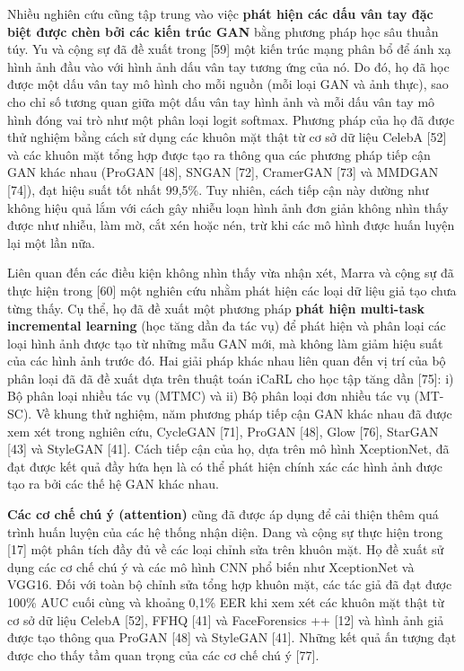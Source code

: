 \documentclass{article}
\begin{document}
Nhiều nghiên cứu cũng tập trung vào việc \textbf{phát hiện các dấu vân tay đặc biệt được chèn bởi các kiến trúc GAN} bằng phương pháp học sâu thuần túy. Yu và cộng sự đã đề xuất trong [59] một kiến trúc mạng phân bổ để ánh xạ hình ảnh đầu vào với hình ảnh dấu vân tay tương ứng của nó. Do đó, họ đã học được một dấu vân tay mô hình cho mỗi nguồn (mỗi loại GAN và ảnh thực), sao cho chỉ số tương quan giữa một dấu vân tay hình ảnh và mỗi dấu vân tay mô hình đóng vai trò như một phân loại logit softmax. Phương pháp của họ đã được thử nghiệm bằng cách sử dụng các khuôn mặt thật từ cơ sở dữ liệu CelebA [52] và các khuôn mặt tổng hợp được tạo ra thông qua các phương pháp tiếp cận GAN khác nhau (ProGAN [48], SNGAN [72], CramerGAN [73] và MMDGAN [74]), đạt hiệu suất tốt nhất 99,5\%. Tuy nhiên, cách tiếp cận này dường như không hiệu quả lắm với cách gây nhiễu loạn hình ảnh đơn giản không nhìn thấy được như nhiễu, làm mờ, cắt xén hoặc nén, trừ khi các mô hình được huấn luyện lại một lần nữa.

Liên quan đến các điều kiện không nhìn thấy vừa nhận xét, Marra và cộng sự đã thực hiện trong [60] một nghiên cứu nhằm phát hiện các loại dữ liệu giả tạo chưa từng thấy. Cụ thể, họ đã đề xuất một phương pháp \textbf{phát hiện multi-task incremental learning} (học tăng dần đa tác vụ) để phát hiện và phân loại các loại hình ảnh được tạo từ những mẫu GAN mới, mà không làm giảm hiệu suất của các hình ảnh trước đó. Hai giải pháp khác nhau liên quan đến vị trí của bộ phân loại đã đã đề xuất dựa trên thuật toán iCaRL cho học tập tăng dần [75]: i) Bộ phân loại nhiều tác vụ (MTMC) và ii) Bộ phân loại đơn nhiều tác vụ (MT-SC). Về khung thử nghiệm, năm phương pháp tiếp cận GAN khác nhau đã được xem xét trong nghiên cứu, CycleGAN [71], ProGAN [48], Glow [76], StarGAN [43] và StyleGAN [41]. Cách tiếp cận của họ, dựa trên mô hình XceptionNet, đã đạt được kết quả đầy hứa hẹn là có thể phát hiện chính xác các hình ảnh được tạo ra bởi các thế hệ GAN khác nhau.

\textbf{Các cơ chế chú ý (attention)} cũng đã được áp dụng để cải thiện thêm quá trình huấn luyện của các hệ thống nhận diện. Dang và cộng sự thực hiện trong [17] một phân tích đầy đủ về các loại chỉnh sửa trên khuôn mặt. Họ đề xuất sử dụng các cơ chế chú ý và các mô hình CNN phổ biến như XceptionNet và VGG16. Đối với toàn bộ chỉnh sửa tổng hợp khuôn mặt, các tác giả đã đạt được 100\% AUC cuối cùng và khoảng 0,1\% EER khi xem xét các khuôn mặt thật từ cơ sở dữ liệu CelebA [52], FFHQ [41] và FaceForensics ++ [12] và hình ảnh giả được tạo thông qua ProGAN [48] và StyleGAN [41]. Những kết quả ấn tượng đạt được cho thấy tầm quan trọng của các cơ chế chú ý [77].
\end{document}
